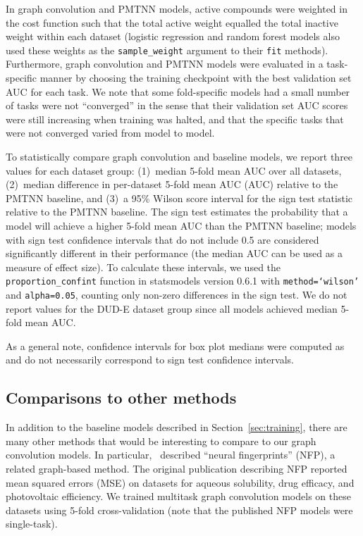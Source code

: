 In graph convolution and PMTNN models, active compounds were weighted in the
cost function such that the total active weight equalled the total inactive
weight within each dataset (logistic regression and random forest models also
used these weights as the \texttt{sample\_weight} argument to their \texttt{fit}
methods). Furthermore, graph convolution and PMTNN models were evaluated in a
task-specific manner by choosing the training checkpoint with the best
validation set AUC for each task. We note that some fold-specific models had a
small number of tasks were not ``converged'' in the sense that their validation
set AUC scores were still increasing when training was halted, and that the
specific tasks that were not converged varied from model to model.

To statistically compare graph convolution and baseline models, we report three
values for each dataset group: (1)~median 5-fold mean AUC over all datasets,
(2)~median difference in per-dataset 5-fold mean AUC (AUC) relative to
the PMTNN baseline, and (3)~a 95\% Wilson score interval for the sign test
statistic relative to the PMTNN baseline. The sign test estimates the
probability that a model will achieve a higher 5-fold mean AUC than the PMTNN
baseline; models with sign test confidence intervals that do not include 0.5
are considered significantly different in their performance (the median
AUC can be used as a measure of effect size). To calculate these
intervals, we used the \texttt{proportion\_confint} function in statsmodels
\citep{seabold2010statsmodels} version 0.6.1 with \texttt{method=`wilson'} and
\texttt{alpha=0.05}, counting only non-zero differences in the sign test.  We do
not report values for the DUD-E dataset group since all models achieved 
median 5-fold mean AUC.

As a general note, confidence intervals for box plot medians were computed as
 \citep{mcgill1978variations} and do
not necessarily correspond to sign test confidence intervals.

\subsection{Comparisons to other methods}
\label{sec:other_comparisons}

In addition to the baseline models described in Section~\ref{sec:training},
there are many other methods that would be interesting to compare to our graph
convolution models. In particular,~\citet{duvenaud2015convolutional} described
``neural fingerprints'' (NFP), a related graph-based method. The original
publication describing NFP reported mean squared errors (MSE) on datasets for
aqueous solubility, drug efficacy, and photovoltaic efficiency. We trained
multitask graph convolution models on these datasets using 5-fold
cross-validation (note that the published NFP models were single-task).

